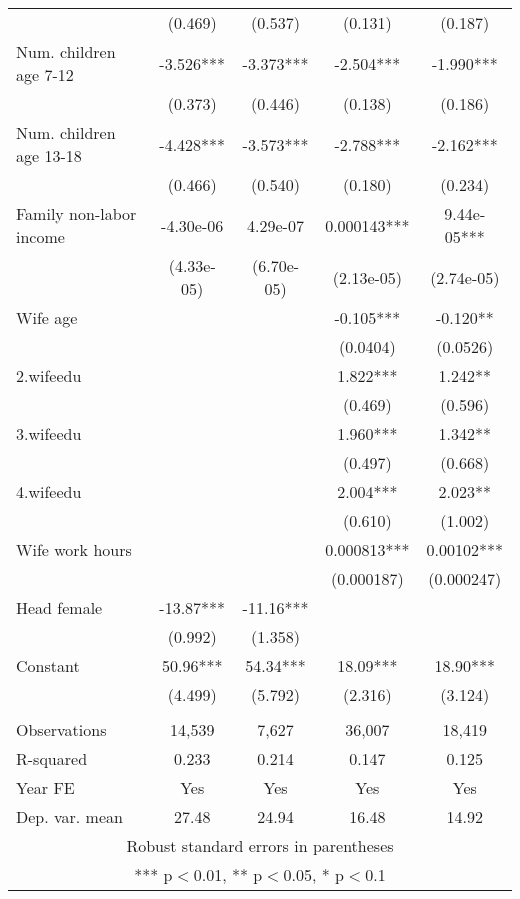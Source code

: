 \begin{tabular}{lcccc}
 & (0.469) & (0.537) & (0.131) & (0.187) \\
Num. children age 7-12 & -3.526*** & -3.373*** & -2.504*** & -1.990*** \\
 & (0.373) & (0.446) & (0.138) & (0.186) \\
Num. children age 13-18 & -4.428*** & -3.573*** & -2.788*** & -2.162*** \\
 & (0.466) & (0.540) & (0.180) & (0.234) \\
Family non-labor income & -4.30e-06 & 4.29e-07 & 0.000143*** & 9.44e-05*** \\
 & (4.33e-05) & (6.70e-05) & (2.13e-05) & (2.74e-05) \\
Wife age &  &  & -0.105*** & -0.120** \\
 &  &  & (0.0404) & (0.0526) \\
2.wifeedu &  &  & 1.822*** & 1.242** \\
 &  &  & (0.469) & (0.596) \\
3.wifeedu &  &  & 1.960*** & 1.342** \\
 &  &  & (0.497) & (0.668) \\
4.wifeedu &  &  & 2.004*** & 2.023** \\
 &  &  & (0.610) & (1.002) \\
Wife work hours &  &  & 0.000813*** & 0.00102*** \\
 &  &  & (0.000187) & (0.000247) \\
Head female & -13.87*** & -11.16*** &  &  \\
 & (0.992) & (1.358) &  &  \\
Constant & 50.96*** & 54.34*** & 18.09*** & 18.90*** \\
 & (4.499) & (5.792) & (2.316) & (3.124) \\
 &  &  &  &  \\
Observations & 14,539 & 7,627 & 36,007 & 18,419 \\
R-squared & 0.233 & 0.214 & 0.147 & 0.125 \\
Year FE & Yes & Yes & Yes & Yes \\
 Dep. var. mean & 27.48 & 24.94 & 16.48 & 14.92 \\ \hline
\multicolumn{5}{c}{ Robust standard errors in parentheses} \\
\multicolumn{5}{c}{ *** p$<$0.01, ** p$<$0.05, * p$<$0.1} \\
\end{tabular}
